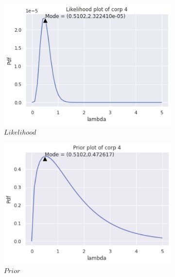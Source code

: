 \documentclass[english,a4paper,12pt]{article}
\begin{document}
\begin{enumerate}
\begin{itemize}
 {\begin{figure} [h!]
     \centering
     \begin{subfigure}[b]{0.3\textwidth}
         \centering
         \includegraphics[width=\textwidth]{pictures/Q3/Likelihood_C4.png}
         \caption{$Likelihood$}
         \label{Likelihood}
     \end{subfigure}
     \hfill
     \begin{subfigure}[b]{0.3\textwidth}
         \centering
         \includegraphics[width=\textwidth]{pictures/Q3/Prior_C4.png}
         \caption{$Prior$}
         \label{Prior}
     \end{subfigure}
     \hfill
     \begin{subfigure}[b]{0.3\textwidth}
         \centering

\end{subfigure}
\end{figure}}
\end{itemize}
\end{enumerate}
\end{document}
